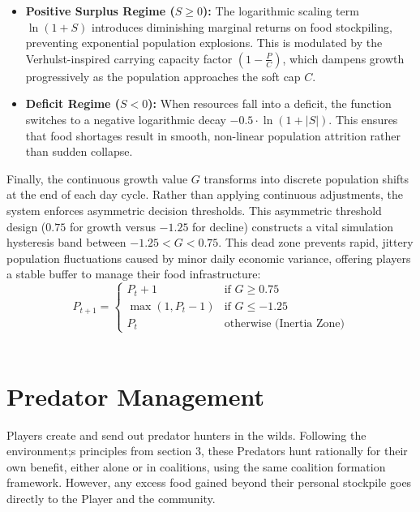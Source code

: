 \documentclass[12pt,a4paper]{report}
\begin{document}
	\begin{itemize}
		\item \textbf{Positive Surplus Regime ($S \ge 0$):} The logarithmic scaling term $\ln(1 + S)$ introduces diminishing marginal returns on food stockpiling, preventing exponential population explosions. This is modulated by the Verhulst-inspired carrying capacity factor $\left(1 - \frac{P}{C}\right)$, which dampens growth progressively as the population approaches the soft cap $C$.
		\item \textbf{Deficit Regime ($S < 0$):} When resources fall into a deficit, the function switches to a negative logarithmic decay $-0.5 \cdot \ln(1 + |S|)$. This ensures that food shortages result in smooth, non-linear population attrition rather than sudden collapse.
	\end{itemize}

	Finally, the continuous growth value $G$ transforms into discrete population shifts at the end of each day cycle. Rather than applying continuous adjustments, the system enforces asymmetric decision thresholds. This asymmetric threshold design ($0.75$ for growth versus $-1.25$ for decline) constructs a vital simulation hysteresis band between $-1.25 < G < 0.75$. This dead zone prevents rapid, jittery population fluctuations caused by minor daily economic variance, offering players a stable buffer to manage their food infrastructure: \\

	\[
	P_{t+1} = 
	\begin{cases} 
	P_t + 1 & \text{if } G \ge 0.75 \\[4pt]
	\max(1, P_t - 1) & \text{if } G \le -1.25 \\[4pt]
	P_t & \text{otherwise (Inertia Zone)}
	\end{cases}
	\]  \\

	\section{Predator Management}
		
	Players create and send out predator hunters in the wilds. Following the environment;s principles from section 3, these Predators hunt rationally for their own benefit, either alone or in coalitions, using the same coalition formation framework. However, any excess food gained beyond their personal stockpile goes directly to the Player and the community. \\
	
\end{document}
